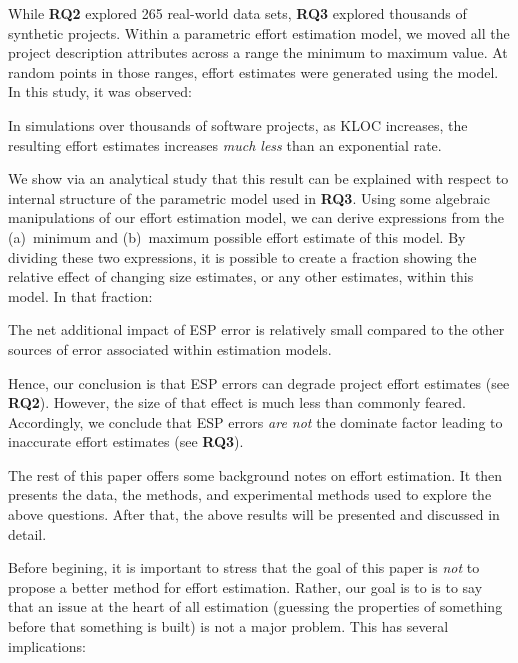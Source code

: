 \documentclass[final,twocolumn]{elsarticle}
\theoremstyle{break}
\begin{document}
While {\bf RQ2} explored 265 real-world data sets, {\bf RQ3} explored thousands
of synthetic projects.  Within a parametric effort estimation model, we moved
all the project description attributes
across a range the minimum to maximum value. At random
points in those ranges, effort estimates were generated using the model.  In this
study, it was observed:

\begin{lesson0}
  In simulations over thousands of software projects,
  as KLOC increases, the resulting effort estimates increases {\em much less} than an exponential rate.
\end{lesson0}

We show via an analytical study 
that this result can be explained with respect to internal structure
of the parametric model used in {\bf RQ3}. Using some algebraic manipulations of
our effort estimation model,
we can derive expressions from
 the (a)~minimum and (b)~maximum possible effort estimate of this model.
By dividing these two expressions, it is possible to create a fraction showing
the relative effect of changing size estimates, or any other estimates, within this model.
In that fraction:

\begin{lesson0}
  The net additional impact of ESP error is relatively small compared to the other sources of error associated within estimation models.
\end{lesson0}
Hence, our conclusion is that
ESP errors can degrade project
effort estimates (see {\bf RQ2}). However, the size of that effect is much less than commonly feared.
Accordingly, we conclude that  ESP errors {\em are not} the dominate factor leading
to inaccurate effort estimates (see {\bf RQ3}). 

The rest of this paper  offers some background notes on effort estimation.
It then presents the data, the methods, and experimental methods
used to explore the above questions. After that, the above results will be presented
and discussed in detail.

Before begining, it is important to stress
that the goal of this paper is {\em not} to propose a better method for effort
estimation.  Rather, our goal is to is to say that an issue at the heart of all
estimation (guessing the properties of something before that something is built)
is not a major problem. This has several implications:
\end{document}
